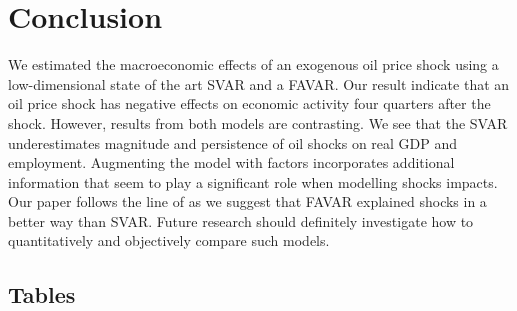 \documentclass[11pt,a4paper]{article}
\begin{document}
\section{Conclusion}
\label{sec:conclusion}

We estimated the macroeconomic effects of an exogenous oil price shock using a low-dimensional state of the art SVAR and a FAVAR. Our result indicate that an oil price shock has negative effects on economic activity four quarters after the shock.
However, results from both models are contrasting. We see that the SVAR underestimates magnitude and persistence of oil shocks on real GDP and employment.
Augmenting the model with factors incorporates additional information that seem to play a significant role when modelling shocks impacts.
Our paper follows the line of \cite{bernanke2005factor} as we suggest that FAVAR explained shocks in a better way than SVAR.
Future research should definitely investigate how to quantitatively and objectively compare such models.


\newpage



\appendix
\setcounter{page}{1}
\renewcommand{\thepage}{A-\arabic{page}}

\nocite{*}



\subsection*{Tables}
\end{document}
